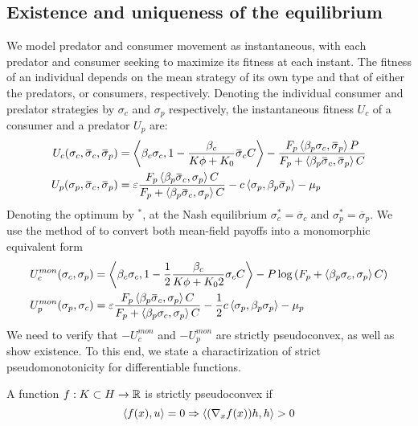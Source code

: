 \subsection{Existence and uniqueness of the equilibrium}
We model predator and consumer movement as instantaneous, with each predator and consumer seeking to maximize its fitness at each instant. The fitness of an individual depends on the mean strategy of its own type and that of either the predators, or consumers, respectively. Denoting the individual consumer and predator strategies by $\sigma_c$ and $\sigma_p$ respectively, the instantaneous fitness $U_c$ of a consumer and a predator $U_p$ are:
\begin{align}
  U_c(\sigma_c, \overbar{\sigma}_c, \overbar{\sigma}_p) &= \ip{\beta_c \sigma_c}{1-\frac{\beta_c}{K\phi + K_0}\overbar{\sigma}_c C} - \frac{F_p \ip{\beta_p \sigma_c}{\overbar{\sigma}_p} P}{F_p + \ip{\beta_p \overbar{\sigma}_c}{\overbar{\sigma}_p} C} \\
  U_p(\sigma_p, \overbar{\sigma}_c, \overbar{\sigma}_p) &= \epsilon \frac{F_p \ip{\beta_p \overbar{\sigma}_c}{\sigma_p} C}{F_p + \ip{\beta_p \overbar{\sigma}_c}{\sigma_p} C} - c \ip{\sigma_p}{\beta_p \overbar{\sigma}_p}  - \mu_p
\end{align}
Denoting the optimum by $^*$, at the Nash equilibrium $\sigma_c^*=\overbar{\sigma}_c$ and $\sigma_p^* = \overbar{\sigma}_p$. We use the method of  to convert both mean-field payoffs into a monomorphic equivalent form 
\begin{align}
  \label{eq:mon_eq_forms}
  U_c^{mon}(\sigma_c, \sigma_p) &= \ip{\beta_c \sigma_c}{1-\frac{1}{2}\frac{\beta_c}{K\phi + K_0 2}\sigma_c C} - P\log\pa{F_p + \ip{\beta_p \sigma_c}{\sigma_p} C} \\
  U^{mon}_p(\sigma_p, \sigma_c) &= \epsilon \frac{F_p \ip{\beta_p \overbar{\sigma}_c}{\sigma_p} C}{F_p + \ip{\beta_p \sigma_c}{\sigma_p} C} - \frac{1}{2}c \ip{\sigma_p}{\beta_p \sigma_p}  - \mu_p
\end{align}
We need to verify that $-U_c^{mon}$ and $-U_p^{mon}$ are strictly pseudoconvex, as well as show existence. To this end, we state a charactirization of strict pseudomonotonicity for differentiable functions.
\begin{lemma}
  A function $f: K \subset H \to \mathbb{R}$ is strictly pseudoconvex if
  \begin{equation}
    \left \langle f(x),u \right \rangle = 0 \Rightarrow \left \langle (\nabla_x f(x))h,h \right \rangle > 0
  \end{equation}
\end{lemma}
